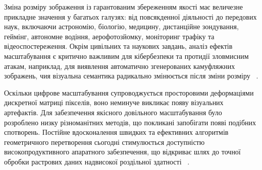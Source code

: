 Зміна розміру зображення із гарантованим збереженням якості має величезне прикладне значення у багатьох галузях: від повсякденної діяльності до передових наук, включаючи астрономію, біологію, медицину, дистанційне зондування, геймінг, автономне водіння, аерофотозйомку, моніторинг трафіку та відеоспостереження. Окрім цивільних та наукових завдань, аналіз ефектів масштабування є критично важливим для кібербезпеки та протидії зловмисним атакам, наприклад, для виявлення автоматично згенерованих камуфляжних зображень, чия візуальна семантика радикально змінюється після зміни розміру ~\cite{wolberg1992digital}.

Оскільки цифрове масштабування супроводжується просторовими деформаціями дискретної матриці пікселів, воно неминуче викликає появу візуальних артефактів. Для забезпечення якісного довільного масштабування було розроблено низку різноманітних методів, що покликані запобігати появі подібних спотворень. Постійне вдосконалення швидких та ефективних алгоритмів геометричного перетворення сьогодні стимулюється доступністю високопродуктивного апаратного забезпечення, що відкриває шлях до точної обробки растрових даних надвисокої роздільної здатності ~\cite{wolberg1992digital}.